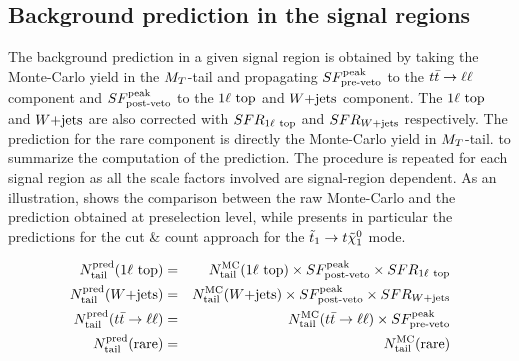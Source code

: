         \subsection{Background prediction in the signal regions}

        The background prediction in a given signal region is obtained by taking the Monte-Carlo
        yield in the $M_T$-tail and propagating $SF_{\text{pre-veto}}^{\text{peak}}$ to the $t\bar{t} \rightarrow \ell \ell$ component and $SF_{\text{post-veto}}^{\text{peak}}$
        to the $1\ell~\text{top}$ and $\text{$W$+jets}$ component. The $1\ell~\text{top}$ and $\text{$W$+jets}$
        are also corrected with $SFR_{1\ell~\text{top}}$ and $SFR_{\text{$W$+jets}}$ respectively. The
        prediction for the rare component is directly the Monte-Carlo yield in $M_T$-tail.
         to  summarize
        the computation of the prediction. The procedure is repeated for each signal
        region as all the scale factors involved are signal-region dependent. As an
        illustration, 
        shows the comparison between the raw Monte-Carlo and the prediction obtained at
        preselection level, while  presents in particular
        the predictions for the cut \& count approach for the
        $\tilde{t}_1 \rightarrow t \tilde{\chi}_1^0$ mode.

        \begin{eqnarray}
            N^\text{pred}_\text{tail}(1\ell~\text{top}) & = & N^\text{MC}_\text{tail}(1\ell~\text{top})  \times SF_{\text{post-veto}}^{\text{peak}} \times SFR_{1\ell~\text{top}} \label{eq:prediction1ltop}  \\
            N^\text{pred}_\text{tail}(\text{$W$+jets})        & = & N^\text{MC}_\text{tail}(\text{$W$+jets})         \times SF_{\text{post-veto}}^{\text{peak}}  \times SFR_{\text{$W$+jets}}                             \\
            N^\text{pred}_\text{tail}(t\bar{t} \rightarrow \ell \ell)  & = & N^\text{MC}_\text{tail}(t\bar{t} \rightarrow \ell \ell)   \times SF_{\text{pre-veto}}^{\text{peak}}                                                \\
            N^\text{pred}_\text{tail}(\text{rare})   & = & N^\text{MC}_\text{tail}(\text{rare})                                           \label{eq:predictionrare}
        \end{eqnarray}

